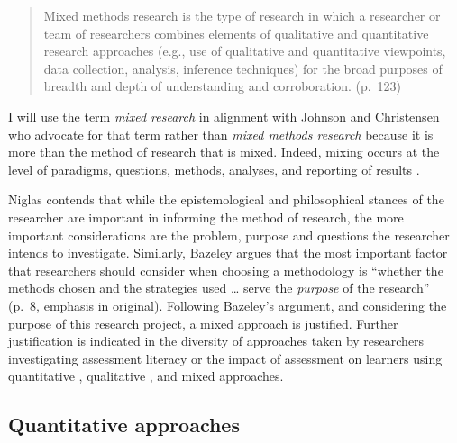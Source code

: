 \documentclass[
]{book}
\begin{document}
\begin{quote}
Mixed methods research is the type of research in which a researcher or team of researchers combines elements of qualitative and quantitative research approaches (e.g., use of qualitative and quantitative viewpoints, data collection, analysis, inference techniques) for the broad purposes of breadth and depth of understanding and corroboration. (p.~123)
\end{quote}

I will use the term \emph{mixed research} in alignment with Johnson and Christensen \citeyearpar{johnsonEducationalResearchQuantitative2017} who advocate for that term rather than \emph{mixed methods research} because it is more than the method of research that is mixed. Indeed, mixing occurs at the level of paradigms, questions, methods, analyses, and reporting of results \citep{bazeleyIntegratingAnalysesMixed2018}.

Niglas \citeyearpar{niglasMultidimensionalModelResearch2010} contends that while the epistemological and philosophical stances of the researcher are important in informing the method of research, the more important considerations are the problem, purpose and questions the researcher intends to investigate. Similarly, Bazeley \citeyearpar{bazeleyIntegratingAnalysesMixed2018} argues that the most important factor that researchers should consider when choosing a methodology is ``whether the methods chosen and the strategies used \ldots{} serve the \emph{purpose} of the research'' (p.~8, emphasis in original). Following Bazeley's argument, and considering the purpose of this research project, a mixed approach is justified. Further justification is indicated in the diversity of approaches taken by researchers investigating assessment literacy or the impact of assessment on learners using quantitative \citep{delucaTeachersApproachesClassroom2016, delucaExploringAssessmentCultures2021, masseyAssessmentLiteracyCollege2020, nayaginPreserviceTeachersApproaches2020, pereiraHowUndergraduatesPerceive2021}, qualitative \citep{boudWhatFeedbackLiterate2021, coombsSeaSeaCanadian2020, delucaPedagogySlowSignificant2021, earleBalancingDemandsValidity2020, fivesNavigatingComplexCognitive2020, medlandAssessmentIlliterateShared2019, watsonSmallDataOnline2017}, and mixed \citep{delucaStudentPerspectivesAssessment2018, nicholsonEnhancingStudentEngagement2018, iannoneImpactHighStakes2020, tekirAlignmentIntendedEnacted2021} approaches.

\hypertarget{quantitative-approaches}{%
\subsection*{Quantitative approaches}\label{quantitative-approaches}}
\end{document}
